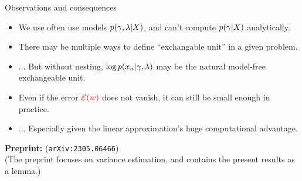 
\begin{frame}{Observations and consequences}


\begin{minipage}{0.38\textwidth}
    \ElectionData{}
\end{minipage}
\begin{minipage}{0.38\textwidth}
    \ElectionResultsGlobal{}
\end{minipage}



%
\begin{itemize}
\item We use often use models $p(\gamma, \lambda \vert X)$, and can't 
      compute $p(\gamma \vert X)$ analytically.
\item There may be multiple ways to define ``exchangable unit'' in a given
      problem.
\item[] ... But without nesting,
        $\log p(x_n \vert \gamma, \lambda)$
        may be the natural model-free exchangeable unit.
\item Even if the error $\textcolor{red}{\mathcal{E}(w)}$ does not vanish,
      it can still be small enough in practice.
      \item[] ... Especially given the linear approximation's huge computational advantage.
\end{itemize}


\hrulefill

\textbf{Preprint: }\citet{giordano:2023:bayesij} (\texttt{arXiv:2305.06466})\\
(The preprint focuses on variance estimation, and contains
the present results as a lemma.)
    
\end{frame}


